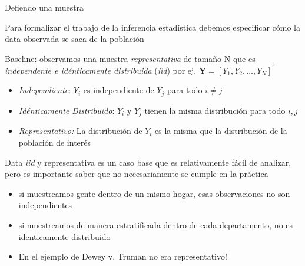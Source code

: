 \documentclass[11pt,handout,aspectratio=169]{beamer}
\newenvironment{wideitemize}{\itemize\addtolength{\itemsep}{10pt}}{\enditemize}
\begin{document}
\begin{frame}{Defiendo una muestra}
	\begin{wideitemize}	
	
	\item
	Para formalizar el trabajo de la inferencia estadística debemos especificar cómo la data observada se saca de la población	
	
	\pause{}
	

	\item Baseline: observamos una muestra \textit{representativa} de tamaño N que es \emph{independente e idénticamente distribuida} (\emph{iid}) por ej. $\mathbf{Y}=[Y_{1},Y_{2},\dots,Y_{N}]^\prime$
	
	\pause{}\smallskip
\begin{itemize}
	\item \emph{Independiente}: $Y_i$ es independiente de $Y_j$ para todo $i\neq j$
	
\smallskip
	\pause{}
	\item \emph{Idénticamente Distribuido}: $Y_i$ y $Y_j$ tienen la misma distribución para todo $i,j$

\pause{}
\smallskip
	\item
	\emph{Representativo:} La distribución de $Y_i$ es la misma que la distribución de la población de interés
	
\end{itemize}		
	\pause	
	\item	
	Data \emph{iid} y representativa es un caso base que es relativamente fácil de analizar, pero es importante saber que no necesariamente se cumple en la práctica
		\begin{itemize}
			\pause
\smallskip
			\item
			si muestreamos gente dentro de un mismo hogar, esas observaciones no son independientes 
		
\smallskip	
			\pause
			\item
			si muestreamos de manera estratificada dentro de cada departamento, no es identicamente distribuido
			\pause

\smallskip
			\item 
			En el ejemplo de Dewey v. Truman no era representativo! 
		\end{itemize}
	\end{wideitemize}

\end{frame}
\end{document}
